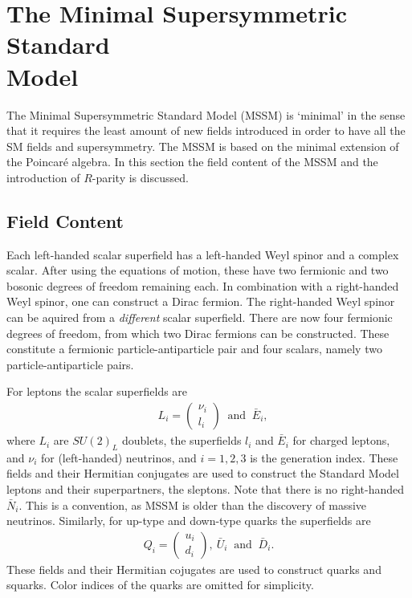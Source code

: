 \documentclass[twoside,english]{uiofysmaster}
\begin{document}
\section{The Minimal Supersymmetric Standard\\ Model}

The Minimal Supersymmetric Standard Model (MSSM) is `minimal' in the sense that it requires the least amount of new fields introduced in order to have all the SM fields and supersymmetry. The MSSM is based on the minimal extension of the Poincar\'{e} algebra. In this section the field content of the MSSM and the introduction of $R$-parity is discussed.


\subsection{Field Content}

Each left-handed scalar superfield has a left-handed Weyl spinor and a complex scalar. After using the equations of motion, these have two fermionic and two 	bosonic degrees of freedom remaining each. In combination with a right-handed Weyl spinor, one can construct a Dirac fermion. The right-handed Weyl spinor can be aquired from a \textit{different} scalar superfield. There are now four fermionic degrees of freedom, from which two Dirac fermions can be constructed. These constitute a fermionic particle-antiparticle pair and four scalars, namely two particle-antiparticle pairs.

For leptons the scalar superfields are 
\begin{align}
&L_i = \begin{pmatrix}
\nu_i\\
l_i
\end{pmatrix}
~\text{ and } ~
\bar{E}_i,
\end{align}
where $L_i$ are $SU(2)_L$ doublets, the superfields $l_i$ and $\bar{E}_i$ for charged leptons, and $\nu_i$ for (left-handed) neutrinos, and $i=1,2,3$ is the generation index. These fields and their Hermitian conjugates are used to construct the Standard Model leptons and their superpartners, the sleptons. Note that there is no right-handed $\bar{N}_i$. This is a convention, as MSSM is older than the discovery of massive neutrinos. Similarly, for up-type and down-type quarks the superfields are
\begin{align}
Q_i = \begin{pmatrix}
u_i\\
d_i
\end{pmatrix},
~ \bar{U}_i ~ \text{ and }~ \bar{D}_i.
\end{align}
These fields and their Hermitian cojugates are used to construct quarks and squarks. Color indices of the quarks are omitted for simplicity.
\end{document}
